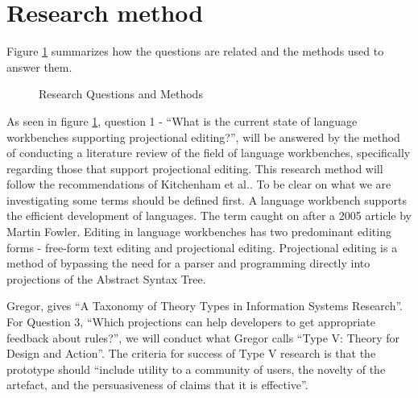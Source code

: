 \section{Research method}

Figure \ref{fig:Research_Questions} summarizes how the questions are related and the methods used to answer them.
\begin{figure}[H]
    \centering
    \caption{Research Questions and Methods}
    \label{fig:Research_Questions}
\end{figure}

As seen in figure \ref{fig:Research_Questions}, question 1 - ``What is the current state of language workbenches supporting projectional editing?'', will be answered by the method of conducting a literature review of the field of language workbenches, specifically regarding those that support projectional editing. 
This research method will follow the recommendations of Kitchenham et al.\cite{kitchenham2015evidence}.
To be clear on what we are investigating some terms should be defined first.
A language workbench supports the efficient development of languages. 
The term caught on after a 2005 article by Martin Fowler\cite{Fowler_lwb}. 
Editing in language workbenches has two predominant editing forms - free-form text editing and projectional editing\cite{erdweg2013state}.
Projectional editing is a method of bypassing the need for a parser and programming directly into projections of the Abstract Syntax Tree.

Gregor\cite{gregor2006nature}, gives ``A Taxonomy of Theory Types in Information Systems Research''. 
For Question 3, ``Which projections can help developers to get appropriate feedback about rules?'', we will conduct what Gregor calls ``Type V: Theory for Design and Action''. 
The criteria for success of Type V research is that the prototype should ``include utility to a community of users, the novelty of the artefact, and the persuasiveness of claims that it is effective''.

